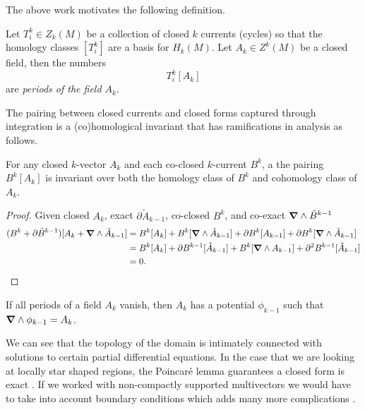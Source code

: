 \documentclass{article}
\begin{document}
The above work motivates the following definition.
\begin{definition}
Let $T_i^k \in Z_k(M)$ be a collection of closed $k$ currents (cycles) so that the homology classes $[T_i^k]$ are a basis for $H_k(M)$. Let $A_k \in Z^k(M)$ be a closed field, then the numbers
\begin{equation}
    T_i^k[A_k]
\end{equation}
are \emph{periods of the field $A_k$}. 
\end{definition}


The pairing between closed currents and closed forms captured through integration is a (co)homological invariant that has ramifications in analysis as follows. 
\begin{proposition}
\label{def:period}
For any closed $k$-vector $A_k$ and each co-closed $k$-current $B^k$, a the pairing $B^k[A_k]$ is invariant over both the homology class of $B^k$ and cohomology class of $A_k$.
\end{proposition}
\begin{proof}
Given closed $A_k$, exact $\partial \tilde{A}_{k-1}$, co-closed $B^k$, and co-exact $\boldsymbol{\nabla} \wedge \tilde{B}^{k-1}$
\begin{align}
(B^k+\partial \tilde{B}^{k-1})[A_k + \boldsymbol{\nabla} \wedge \tilde{A}_{k-1}] &= B^k[A_k]+B^k[\boldsymbol{\nabla} \wedge \tilde{A}_{k-1}]+\partial B^k[A_{k-1}]+\partial B^k[\boldsymbol{\nabla} \wedge \tilde{A}_{k-1}]\\
&= B^k[A_k] + \partial B^{k-1}[\tilde{A}_{k-1}] + B^k[\boldsymbol{\nabla} \wedge A_{k-1}]+\partial^2 B^{k-1}[\tilde{A}_{k-1}]\\
&=0.
\end{align}
\end{proof}
\begin{proposition}
\label{prop:periods}
    If all periods of a field $A_k$ vanish, then $A_k$ has a potential $\phi_{k-1}$ such that $\boldsymbol{\nabla} \wedge \phi_{k-1}=A_k$.
\end{proposition}
We can see that the topology of the domain is intimately connected with solutions to certain partial differential equations. In the case that we are looking at locally star shaped regions, the Poincar\'e lemma guarantees a closed form is exact \cite[Proposition 5]{giaquinta_cartesian_1998}. If we worked with non-compactly supported multivectors we would have to take into account boundary conditions which adds many more complications \cite{schwarz_hodge_1995}.
\end{document}

